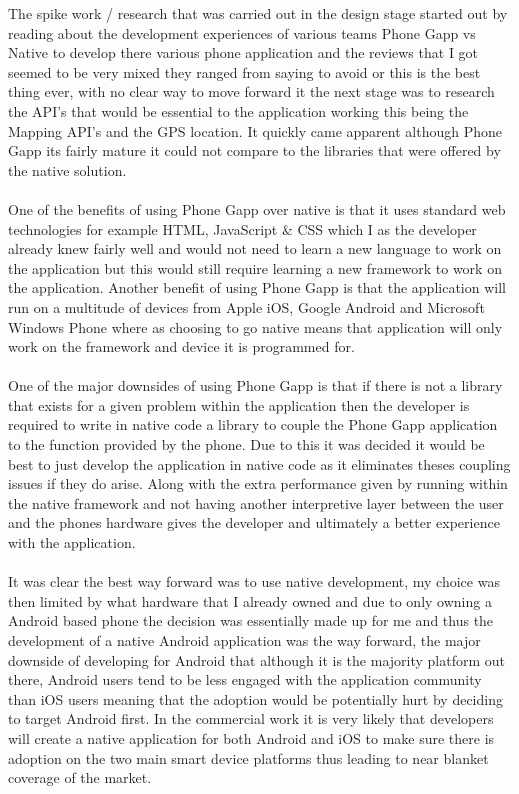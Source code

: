 The spike work / research that was carried out in the design stage started out by reading about the development experiences of various teams Phone Gapp vs Native to develop there various phone application and the reviews that I got seemed to be very mixed they ranged from saying to avoid or this is the best thing ever, with no clear way to move forward it the next stage was to research the API's that would be essential to the application working this being the Mapping API's and the GPS location. It quickly came apparent although Phone Gapp its fairly mature it could not compare to the libraries that were offered by the native solution.\\
\\
One of the benefits of using Phone Gapp over native is that it uses standard web technologies for example HTML, JavaScript \& CSS which I as the developer already knew fairly well and would not need to learn a new language to work on the application but this would still require learning a new framework to work on the application. Another benefit of using Phone Gapp is that the application will run on a multitude of devices from Apple iOS, Google Android and Microsoft Windows Phone where as choosing to go native means that application will only work on the framework and device it is programmed for.\\
\\
One of the major downsides of using Phone Gapp is that if there is not a library that exists for a given problem within the application then the developer is required to write in native code a library to couple the Phone Gapp application to the function provided by the phone. Due to this it was decided it would be best to just develop the application in native code as it eliminates theses coupling issues if they do arise. Along with the extra performance given by running within the native framework and not having another interpretive layer between the user and the phones hardware gives the developer and ultimately a better experience with the application.\\
\\
It was clear the best way forward was to use native development, my choice was then limited by what hardware that I already owned and due to only owning a Android based phone the decision was essentially made up for me and thus the development of a native Android application was the way forward, the major downside of developing for Android that although it is the majority platform out there, Android users tend to be less engaged with the application community than iOS users meaning that the adoption would be potentially hurt by deciding to target Android first. In the commercial work it is very likely that developers will create a native application for both Android and iOS to make sure there is adoption on the two main smart device platforms thus leading to near blanket coverage of the market.\\
